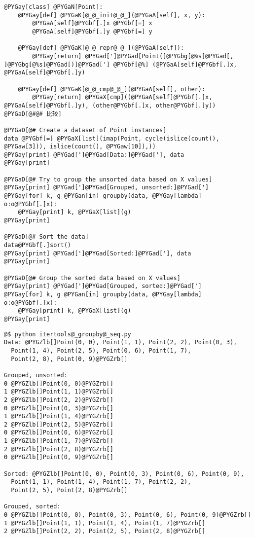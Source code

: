 \documentclass[a4paper,10pt,english]{manual}
\begin{document}
\begin{Verbatim}[commandchars=@\[\]]
@PYGay[class] @PYGaN[Point]:
    @PYGay[def] @PYGaK[@_@_init@_@_](@PYGaA[self], x, y):
        @PYGaA[self]@PYGbf[.]x @PYGbf[=] x
        @PYGaA[self]@PYGbf[.]y @PYGbf[=] y

    @PYGay[def] @PYGaK[@_@_repr@_@_](@PYGaA[self]):
        @PYGay[return] @PYGad[']@PYGad[Point(]@PYGbg[@%s]@PYGad[, ]@PYGbg[@%s]@PYGad[)]@PYGad['] @PYGbf[@%] (@PYGaA[self]@PYGbf[.]x, @PYGaA[self]@PYGbf[.]y)

    @PYGay[def] @PYGaK[@_@_cmp@_@_](@PYGaA[self], other):
        @PYGay[return] @PYGaX[cmp]((@PYGaA[self]@PYGbf[.]x, @PYGaA[self]@PYGbf[.]y), (other@PYGbf[.]x, other@PYGbf[.]y)) @PYGaD[@#@# 比较]

@PYGaD[@# Create a dataset of Point instances]
data @PYGbf[=] @PYGaX[list](imap(Point, cycle(islice(count(), @PYGaw[3])), islice(count(), @PYGaw[10]),))
@PYGay[print] @PYGad[']@PYGad[Data:]@PYGad['], data
@PYGay[print]

@PYGaD[@# Try to group the unsorted data based on X values]
@PYGay[print] @PYGad[']@PYGad[Grouped, unsorted:]@PYGad[']
@PYGay[for] k, g @PYGan[in] groupby(data, @PYGay[lambda] o:o@PYGbf[.]x):
    @PYGay[print] k, @PYGaX[list](g)
@PYGay[print]

@PYGaD[@# Sort the data]
data@PYGbf[.]sort()
@PYGay[print] @PYGad[']@PYGad[Sorted:]@PYGad['], data
@PYGay[print]

@PYGaD[@# Group the sorted data based on X values]
@PYGay[print] @PYGad[']@PYGad[Grouped, sorted:]@PYGad[']
@PYGay[for] k, g @PYGan[in] groupby(data, @PYGay[lambda] o:o@PYGbf[.]x):
    @PYGay[print] k, @PYGaX[list](g)
@PYGay[print]
\end{Verbatim}

\begin{Verbatim}[commandchars=@\[\]]
@$ python itertools@_groupby@_seq.py
Data: @PYGZlb[]Point(0, 0), Point(1, 1), Point(2, 2), Point(0, 3),
  Point(1, 4), Point(2, 5), Point(0, 6), Point(1, 7),
  Point(2, 8), Point(0, 9)@PYGZrb[]

Grouped, unsorted:
0 @PYGZlb[]Point(0, 0)@PYGZrb[]
1 @PYGZlb[]Point(1, 1)@PYGZrb[]
2 @PYGZlb[]Point(2, 2)@PYGZrb[]
0 @PYGZlb[]Point(0, 3)@PYGZrb[]
1 @PYGZlb[]Point(1, 4)@PYGZrb[]
2 @PYGZlb[]Point(2, 5)@PYGZrb[]
0 @PYGZlb[]Point(0, 6)@PYGZrb[]
1 @PYGZlb[]Point(1, 7)@PYGZrb[]
2 @PYGZlb[]Point(2, 8)@PYGZrb[]
0 @PYGZlb[]Point(0, 9)@PYGZrb[]

Sorted: @PYGZlb[]Point(0, 0), Point(0, 3), Point(0, 6), Point(0, 9),
  Point(1, 1), Point(1, 4), Point(1, 7), Point(2, 2),
  Point(2, 5), Point(2, 8)@PYGZrb[]

Grouped, sorted:
0 @PYGZlb[]Point(0, 0), Point(0, 3), Point(0, 6), Point(0, 9)@PYGZrb[]
1 @PYGZlb[]Point(1, 1), Point(1, 4), Point(1, 7)@PYGZrb[]
2 @PYGZlb[]Point(2, 2), Point(2, 5), Point(2, 8)@PYGZrb[]
\end{Verbatim}
\end{document}
